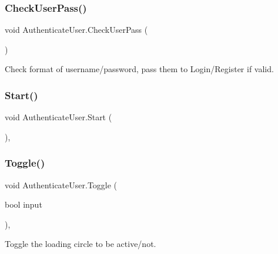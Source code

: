 \subsubsection{\texorpdfstring{CheckUserPass()}{CheckUserPass()}}
{\footnotesize\ttfamily void Authenticate\+User.\+Check\+User\+Pass (\begin{DoxyParamCaption}{ }\end{DoxyParamCaption})\hspace{0.3cm}{\ttfamily [inline]}}



Check format of username/password, pass them to Login/\+Register if valid. 

\mbox{\label{class_authenticate_user_a2fede13427963bbcdd6a7d09a6846f3a}} 
\subsubsection{\texorpdfstring{Start()}{Start()}}
{\footnotesize\ttfamily void Authenticate\+User.\+Start (\begin{DoxyParamCaption}{ }\end{DoxyParamCaption})\hspace{0.3cm}{\ttfamily [inline]}, {\ttfamily [private]}}

\mbox{\label{class_authenticate_user_a58d5801c4d4ea321321ae7729a17ef7f}} 
\subsubsection{\texorpdfstring{Toggle()}{Toggle()}}
{\footnotesize\ttfamily void Authenticate\+User.\+Toggle (\begin{DoxyParamCaption}\item[{bool}]{input }\end{DoxyParamCaption})\hspace{0.3cm}{\ttfamily [inline]}, {\ttfamily [private]}}



Toggle the loading circle to be active/not. 

\mbox{\label{class_authenticate_user_a7c2cb46ec083bb2474c6decf4f165773}} 
